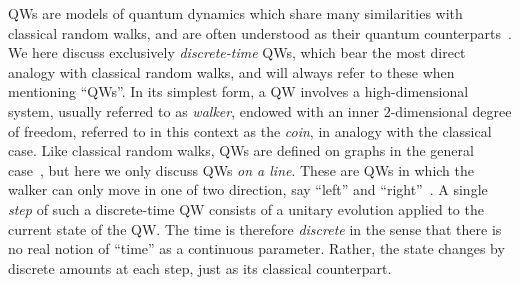 \acp{QW} are models of quantum dynamics which share many similarities with classical random walks, and are often understood as their quantum counterparts~\cite{aharonov2000quantum,kempe2003quantum,venegasandraca2012quantum,portugal2013quantum}.
We here discuss exclusively \emph{discrete-time} \acp{QW}, which bear the most direct analogy with classical random walks, and will always refer to these when mentioning ``QWs''.
In its simplest form, a \ac{QW} involves a high-dimensional system, usually referred to as \emph{walker}, endowed with an inner $2$-dimensional degree of freedom, referred to in this context as the \emph{coin}, in analogy with the classical case.
Like classical random walks, QWs are defined on graphs in the general case~\cite{aharonov2000quantum}, but here we only discuss QWs \emph{on a line}. These are QWs in which the walker can only move in one of two direction, say ``left'' and ``right''~\cite{ambainis2001onedimensional}.
A single \textit{step} of such a discrete-time \ac{QW} consists of a unitary evolution applied to the current state of the \ac{QW}. The time is therefore \emph{discrete} in the sense that there is no real notion of ``time'' as a continuous parameter. Rather, the state changes by discrete amounts at each step, just as its classical counterpart.


